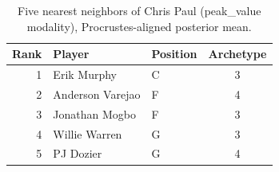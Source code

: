 \begin{table}[htbp]
  \centering\small
  \begin{tabular}{rllc}
    \toprule
    Rank & Player & Position & Archetype \\
    \midrule
    1 & Erik Murphy & C & 3 \\
    2 & Anderson Varejao & F & 4 \\
    3 & Jonathan Mogbo & F & 3 \\
    4 & Willie Warren & G & 3 \\
    5 & PJ Dozier & G & 4 \\
    \bottomrule
  \end{tabular}
  \caption{Five nearest neighbors of Chris Paul (peak_value modality), Procrustes-aligned posterior mean.}
  \label{tab:Chris_Paul_neighbors_peak_value}
\end{table}


